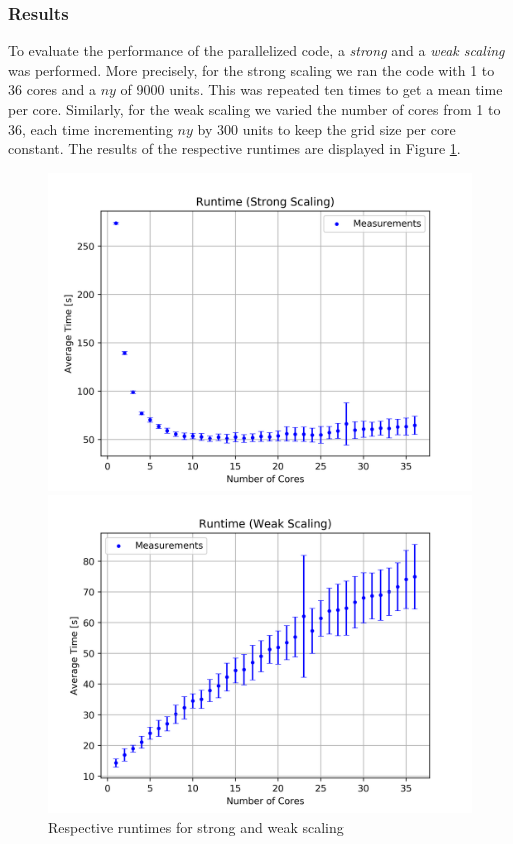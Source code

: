 \documentclass[12pt, a4paper, titlepage]{article}
\begin{document}
{\subsubsection{Results}
To evaluate the performance of the parallelized code, a \textit{strong} and a \textit{weak scaling} was performed. More precisely, for the strong scaling we ran the code with 1 to 36 cores and a $ny$ of 9000 units. This was repeated ten times to get a mean time per core. Similarly, for the weak scaling we varied the number of cores from 1 to 36, each time incrementing $ny$ by 300 units to keep the grid size per core constant. The results of the respective runtimes are displayed in Figure \ref{fig:runtimes}.

\begin{figure}[htbp]
	\begin{minipage}{0.49\textwidth} 
	\includegraphics[width=\textwidth]{pictures/avg_strong.png}
	\end{minipage}
	\hfill
	\begin{minipage}{0.49\textwidth}
	\includegraphics[width=\textwidth]{pictures/avg_weak.png}
	\end{minipage}
	\label{fig:runtimes}
	\caption{Respective runtimes for strong and weak scaling}
	\label{fig:runtimes}
\end{figure}



}
\end{document}
